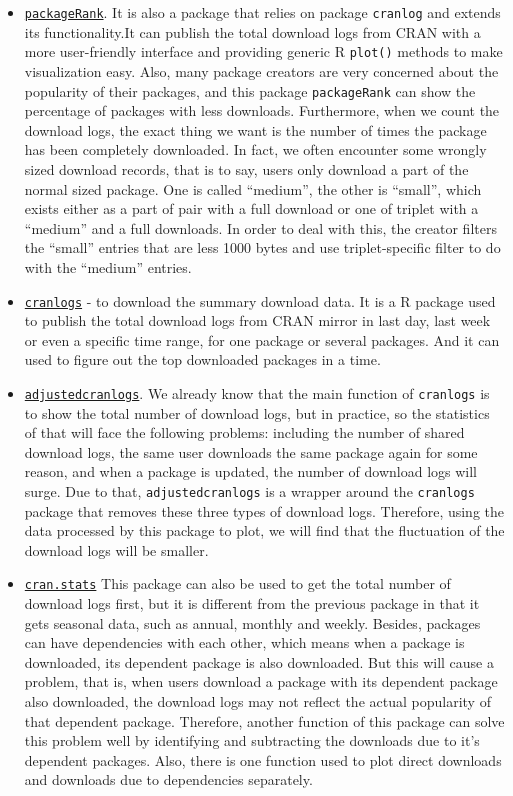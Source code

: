 \documentclass[
]{book}
\begin{document}
\begin{itemize}
\item
  \href{https://github.com/lindbrook/packageRank}{\texttt{packageRank}}.
  It is also a package that relies on package \texttt{cranlog} and extends its functionality.It can publish the total download logs from CRAN with a more user-friendly interface and providing generic R \texttt{plot()} methods to make visualization easy. Also, many package creators are very concerned about the popularity of their packages, and this package \texttt{packageRank} can show the percentage of packages with less downloads. Furthermore, when we count the download logs, the exact thing we want is the number of times the package has been completely downloaded. In fact, we often encounter some wrongly sized download records, that is to say, users only download a part of the normal sized package. One is called ``medium'', the other is ``small'', which exists either as a part of pair with a full download or one of triplet with a ``medium'' and a full downloads. In order to deal with this, the creator filters the ``small'' entries that are less 1000 bytes and use triplet-specific filter to do with the ``medium'' entries.
\item
  \href{https://github.com/r-hub/cranlogs}{\texttt{cranlogs}} - to download the summary download data.
  It is a R package used to publish the total download logs from CRAN mirror in last day, last week or even a specific time range, for one package or several packages. And it can used to figure out the top downloaded packages in a time.
\item
  \href{https://github.com/tylermorganwall/adjustedcranlogs}{\texttt{adjustedcranlogs}}.
  We already know that the main function of \texttt{cranlogs} is to show the total number of download logs, but in practice, so the statistics of that will face the following problems: including the number of shared download logs, the same user downloads the same package again for some reason, and when a package is updated, the number of download logs will surge. Due to that, \texttt{adjustedcranlogs} is a wrapper around the \texttt{cranlogs} package that removes these three types of download logs. Therefore, using the data processed by this package to plot, we will find that the fluctuation of the download logs will be smaller.
\item
  \href{https://github.com/arunsrinivasan/cran.stats}{\texttt{cran.stats}}
  This package can also be used to get the total number of download logs first, but it is different from the previous package in that it gets seasonal data, such as annual, monthly and weekly. Besides, packages can have dependencies with each other, which means when a package is downloaded, its dependent package is also downloaded. But this will cause a problem, that is, when users download a package with its dependent package also downloaded, the download logs may not reflect the actual popularity of that dependent package. Therefore, another function of this package can solve this problem well by identifying and subtracting the downloads due to it's dependent packages. Also, there is one function used to plot direct downloads and downloads due to dependencies separately.

\end{itemize}
\end{document}

